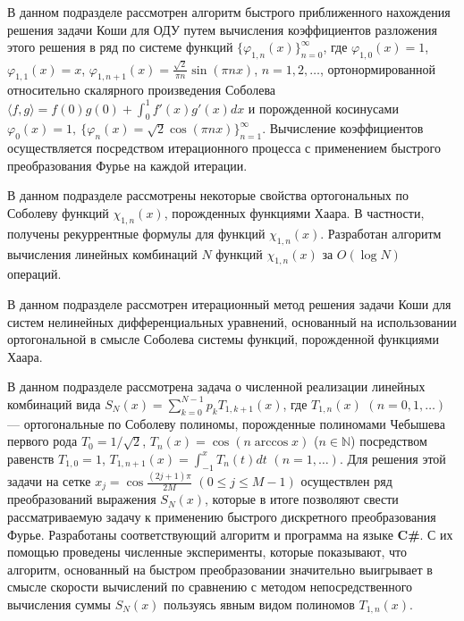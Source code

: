 \Conclusion

%


В данном подразделе рассмотрен алгоритм быстрого приближенного нахождения решения задачи Коши для ОДУ путем вычисления коэффициентов разложения этого решения в ряд по системе функций $\{\varphi_{1,n}(x)\}_{n=0}^{\infty}$, где $ \varphi_{1,0}(x)=1$, $\varphi_{1,1}(x)=x$, $\varphi_{1,n+1}(x)=\frac{\sqrt{2}}{\pi n}\sin(\pi nx)$, $n=1,2,\ldots$,
ортонормированной относительно скалярного произведения Соболева $\langle f, g\rangle=f(0)g(0)+\int_0^1f'(x)g'(x)dx$ и порожденной
косинусами $\varphi_0(x)=1,\ \{\varphi_n(x)=\sqrt{2}\cos(\pi nx)\}_{n=1}^\infty$.
Вычисление коэффициентов осуществляется посредством итерационного процесса с применением быстрого преобразования Фурье на каждой итерации.

В данном подразделе рассмотрены некоторые свойства ортогональных по Соболеву функций $\chi_{1,n}(x)$, порожденных функциями Хаара. В частности, получены рекуррентные формулы для функций $\chi_{1,n}(x)$. Разработан алгоритм вычисления линейных комбинаций $N$ функций $\chi_{1,n}(x)$ за $O(\log N)$ операций.

В данном подразделе рассмотрен итерационный метод решения задачи Коши для систем нелинейных дифференциальных уравнений, основанный на использовании ортогональной в смысле Соболева системы функций, порожденной функциями Хаара.

В данном подразделе рассмотрена задача о численной реализации линейных комбинаций вида  $S_N(x) =\sum\nolimits_{k=0}^{N-1}p_kT_{1,k+1}(x)$, где
$T_{1,n}(x)$ $(n=0,1,\ldots)$ --- ортогональные по Соболеву полиномы, порожденные полиномами Чебышева первого рода $T_{0} = 1 / \sqrt{2}$, $T_{n}(x)=\cos( n\arccos x)$ ($n \in \mathbb{N}$) посредством
равенств $T_{1,0}=1$, $T_{1,n+1}(x) =\int_{-1}^x T_{n}(t)dt$ $(n=1,\ldots)$.
Для решения этой задачи на сетке $x_j=\cos\frac{(2j+1)\pi}{2M}$ $(0\le j\le M-1)$  осуществлен ряд преобразований выражения $S_N(x)$,
которые в итоге позволяют свести рассматриваемую задачу к применению быстрого дискретного преобразования Фурье.
Разработаны соответствующий алгоритм и программа на языке \textbf{C\#}.
С их помощью проведены численные эксперименты, которые показывают, что алгоритм, основанный на быстром преобразовании
значительно выигрывает в смысле скорости вычислений по сравнению с методом непосредственного вычисления суммы $S_N(x)$ пользуясь явным видом полиномов $T_{1,n}(x)$.

